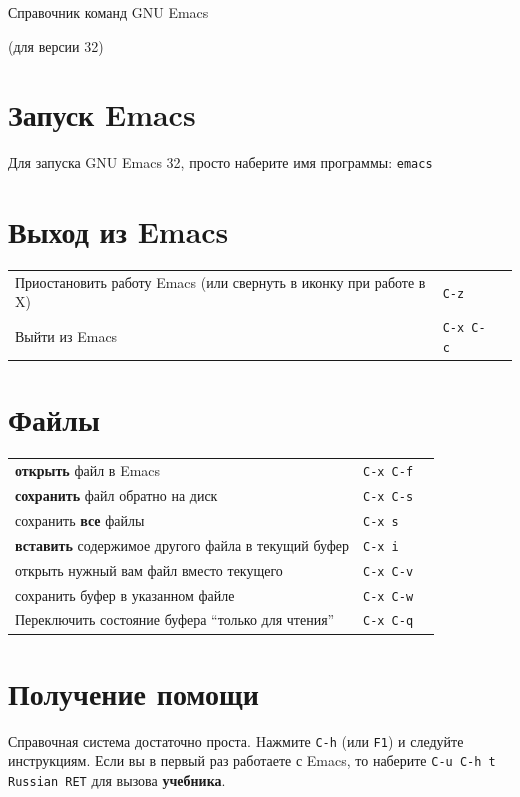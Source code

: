 \documentclass[10pt]{article}
\newlength{\ColWidth}
\newlength{\ColThreeWidth}
\newcommand{\versionemacs}[0]{32} %
\newcommand{\kbd}[1]{\texttt{#1}}
\begin{document}

\centerline{Справочник команд GNU Emacs}
\centerline{(для версии \versionemacs)}

\section{Запуск Emacs}

Для запуска GNU Emacs \versionemacs, просто наберите имя программы: \kbd{emacs}

\section{Выход из Emacs}

\begin{tabular}{p{\ColWidth}p{\ColThreeWidth}p{\ColThreeWidth}}
Приостановить работу Emacs (или свернуть в иконку при работе в X) & \kbd{C-z} \\
Выйти из Emacs & \kbd{C-x C-c} \\
\end{tabular}

\section{Файлы}

\begin{tabular}{p{\ColWidth}p{\ColThreeWidth}p{\ColThreeWidth}}
{\bf открыть} файл в Emacs & \kbd{C-x C-f} \\
{\bf сохранить} файл обратно на диск & \kbd{C-x C-s} \\
сохранить {\bf все} файлы & \kbd{C-x s} \\
{\bf вставить} содержимое другого файла в текущий буфер & \kbd{C-x i} \\
открыть нужный вам файл вместо текущего & \kbd{C-x C-v} \\
сохранить буфер в указанном файле & \kbd{C-x C-w} \\
Переключить состояние буфера ``только для чтения'' & \kbd{C-x C-q} \\
\end{tabular}

\section{Получение помощи}

Справочная система достаточно проста. Hажмите \kbd{C-h} (или \kbd{F1}) и
следуйте инструкциям.  Если вы в первый раз работаете с Emacs, то наберите
\kbd{C-u C-h t Russian RET} для вызова {\bf учебника}.
\end{document}
